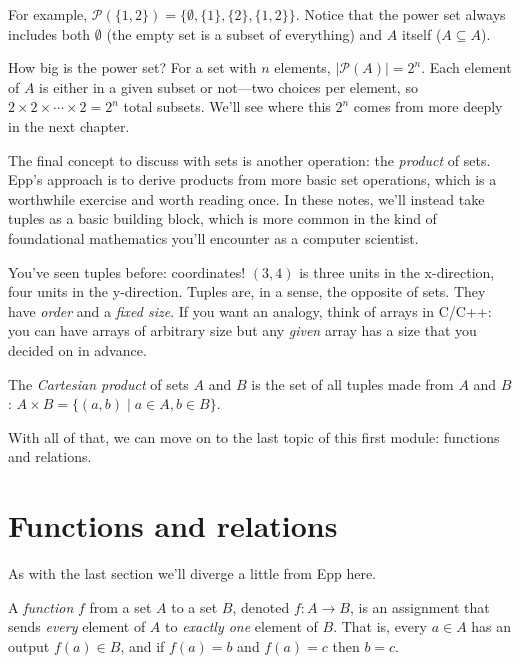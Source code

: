 \documentclass[11pt]{article}
\begin{document}
For example, $\mathcal{P}(\{1, 2\}) = \{\emptyset, \{1\}, \{2\}, \{1,2\}\}$. Notice that the power set always includes both $\emptyset$ (the empty set is a subset of everything) and $A$ itself ($A \subseteq A$).

How big is the power set? For a set with $n$ elements, $|\mathcal{P}(A)| = 2^n$. Each element of $A$ is either in a given subset or not---two choices per element, so $2 \times 2 \times \cdots \times 2 = 2^n$ total subsets. We'll see where this $2^n$ comes from more deeply in the next chapter.

The final concept to discuss with sets is another operation: the \emph{product} of sets. Epp's approach is to derive products from more basic set operations, which is a worthwhile exercise and worth reading once. In these notes, we'll instead take tuples as a basic building block, which is more common in the kind of foundational mathematics you'll encounter as a computer scientist.

You've seen tuples before: coordinates! $(3,4)$ is three units in the x-direction, four units in the y-direction. Tuples are, in a sense, the opposite of sets. They have \emph{order} and a \emph{fixed size}. If you want an analogy, think of arrays in C/C++: you can have arrays of arbitrary size but any \emph{given} array has a size that you decided on in advance.

\begin{definition}
The \emph{Cartesian product} of sets $A$ and $B$ is the set of all tuples made from $A$ and $B$:
$A \times B = \{(a,b) \mid a \in A, b \in B\}$.
\end{definition}

With all of that, we can move on to the last topic of this first module: functions and relations.

\section{Functions and relations}

As with the last section we'll diverge a little from Epp here.

\begin{definition}[Function]
A \emph{function} $f$ from a set $A$ to a set $B$, denoted $f : A \rightarrow B$, is an assignment that sends \emph{every} element of $A$ to \emph{exactly one} element of $B$. That is, every $a \in A$ has an output $f(a) \in B$, and if $f(a) = b$ and $f(a) = c$ then $b = c$.
\end{definition}
\end{document}
